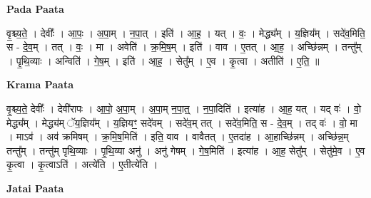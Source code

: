 \documentclass[17pt]{extarticle}
\begin{document}
\textbf{Pada Paata} \newline

वृ॒श्च्य॒ते॒ । देवीः᳚ । आ॒पः॒ । अ॒पा॒म् । न॒पा॒त् । इति॑ । आ॒ह॒ । यत् । वः॒ । मेद्ध्य᳚म् । य॒ज्ञिय᳚म् । सदे॑व॒मिति॒ स - दे॒व॒म् । तत् । वः॒ । मा । अवेति॑ । क्र॒मि॒ष॒म् । इति॑ । वाव । ए॒तत् । आ॒ह॒ । अच्छि॑न्नम् । तन्तु᳚म् । पृ॒थि॒व्याः । अन्विति॑ । गे॒ष॒म् । इति॑ । आ॒ह॒ । सेतु᳚म् । ए॒व । कृ॒त्वा । अतीति॑ । ए॒ति॒ ॥  \newline


\textbf{Krama Paata} \newline

वृ॒श्च्य॒ते॒ देवीः᳚ । देवी॑रापः । आ॒पो॒ अ॒पा॒म् । अ॒पा॒म् न॒पा॒त्॒ । न॒पा॒दिति॑ । इत्या॑ह । आ॒ह॒ यत् । यद् वः॑ । वो॒ मेद्ध्य᳚म् । मेद्ध्य॑म् ॅय॒ज्ञिय᳚म् । य॒ज्ञियꣳ॒॒ सदे॑वम् । सदे॑व॒म् तत् । सदे॑व॒मिति॒ स - दे॒व॒म् । तद् वः॑ । वो॒ मा । माऽव॑ । अव॑ क्रमिषम् । क्र॒मि॒ष॒मिति॑ । इति॒ वाव । वावैतत् । ए॒तदा॑ह । आ॒हाच्छि॑न्नम् । अच्छि॑न्न॒म् तन्तु᳚म् । तन्तु॑म् पृथि॒व्याः । पृ॒थि॒व्या अनु॑ । अनु॑ गेषम् । गे॒ष॒मिति॑ । इत्या॑ह । आ॒ह॒ सेतु᳚म् । सेतु॑मे॒व । ए॒व कृ॒त्वा । कृ॒त्वाऽति॑ । अत्ये॑ति । ए॒तीत्ये॑ति । \newline

\textbf{Jatai Paata} \newline
\end{document}
